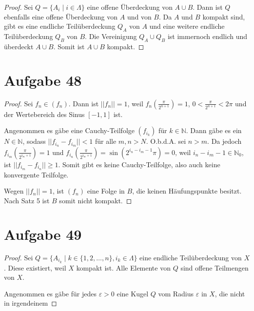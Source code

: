 \documentclass[10pt,a4paper]{article}
\begin{document}
\begin{proof}
  Sei $Q = \{ A_{i} \mid i \in \Lambda \}$ eine offene Überdeckung von $A \cup B$.
  Dann ist $Q$ ebenfalls eine offene Überdeckung von $A$ und von $B$.
  Da $A$ und $B$ kompakt sind, gibt es eine endliche Teilüberdeckung $Q_{A}$ von $A$ und eine weitere endliche Teilüberdeckung $Q_{B}$ von $B$.
  Die Vereinigung $Q_{A} \cup Q_{B}$ ist immernoch endlich und überdeckt $A \cup B$.
  Somit ist $A \cup B$ kompakt.
\end{proof}

\section{Aufgabe 48}

\begin{proof}
  Sei $f_{n} \in (f_{n})$.
  Dann ist $||f_{n}|| = 1$, weil $f_{n}(\frac{\pi}{2^{n + 1}}) = 1$, $0 < \frac{\pi}{2^{n + 1}} < 2\pi$ und der Wertebereich des Sinus $[-1, 1]$ ist.

  Angenommen es gäbe eine Cauchy-Teilfolge $(f_{i_{k}})$ für $k \in \mathbb{N}$.
  Dann gäbe es ein $N \in \mathbb{N}$, sodass $||f_{i_{n}} - f_{i_{m}}|| < 1$ für alle $m, n > N$.
  O.b.d.A. sei $n > m$.
  Da jedoch $f_{i_{m}}(\frac{\pi}{2^{i_{m} + 1}}) = 1$ und $f_{i_{n}}(\frac{\pi}{2^{i_{m} + 1}}) = \sin(2^{i_{n} - i_{m} - 1}\pi) = 0$, weil $i_{n} - i_{m} - 1 \in \mathbb{N}_{0}$, ist $||f_{i_{m}} - f_{i_{n}}|| \ge 1$.
  Somit gibt es keine Cauchy-Teilfolge, also auch keine konvergente Teilfolge.

  Wegen $||f_{n}|| = 1$, ist $(f_{n})$ eine Folge in $B$, die keinen Häufungspunkte besitzt.
  Nach Satz 5 ist $B$ somit nicht kompakt.
\end{proof}

\section{Aufgabe 49}

\begin{proof}
  Sei $Q = \{ A_{i_{k}} \mid k \in \{ 1, 2, \dots, n \}, i_{k} \in \Lambda \}$ eine endliche Teilüberdeckung von $X$.
  Diese existiert, weil $X$ kompakt ist.
  Alle Elemente von $Q$ sind offene Teilmengen von $X$.

  Angenommen es gäbe für jedes $\varepsilon > 0$ eine Kugel $Q$ vom Radius $\varepsilon$ in $X$, die nicht in irgendeinem
\end{proof}
\end{document}
